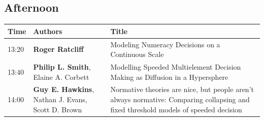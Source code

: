 \documentclass[]{article}
\begin{document}
\subsection{Afternoon}\label{afternoon-1}

\begin{longtable}[]{@{}lll@{}}
\toprule
\begin{minipage}[b]{0.03\columnwidth}\raggedright\strut
Time\strut
\end{minipage} & \begin{minipage}[b]{0.32\columnwidth}\raggedright\strut
Authors\strut
\end{minipage} & \begin{minipage}[b]{0.57\columnwidth}\raggedright\strut
Title\strut
\end{minipage}\tabularnewline
\midrule
\endhead
\begin{minipage}[t]{0.03\columnwidth}\raggedright\strut
13:20\strut
\end{minipage} & \begin{minipage}[t]{0.32\columnwidth}\raggedright\strut
\textbf{Roger Ratcliff}\strut
\end{minipage} & \begin{minipage}[t]{0.57\columnwidth}\raggedright\strut
Modeling Numeracy Decisions on a Continuous Scale\strut
\end{minipage}\tabularnewline
\begin{minipage}[t]{0.03\columnwidth}\raggedright\strut
13:40\strut
\end{minipage} & \begin{minipage}[t]{0.32\columnwidth}\raggedright\strut
\textbf{Philip L. Smith}, Elaine A. Corbett\strut
\end{minipage} & \begin{minipage}[t]{0.57\columnwidth}\raggedright\strut
Modelling Speeded Multielement Decision Making as Diffusion in a
Hypersphere\strut
\end{minipage}\tabularnewline
\begin{minipage}[t]{0.03\columnwidth}\raggedright\strut
14:00\strut
\end{minipage} & \begin{minipage}[t]{0.32\columnwidth}\raggedright\strut
\textbf{Guy E. Hawkins}, Nathan J. Evans, Scott D. Brown\strut
\end{minipage} & \begin{minipage}[t]{0.57\columnwidth}\raggedright\strut
Normative theories are nice, but people aren't always normative:
Comparing collapsing and fixed threshold models of speeded decision

\end{minipage}
\end{longtable}
\end{document}
